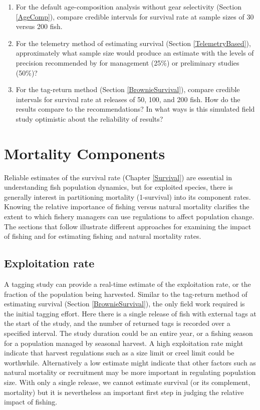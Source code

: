 \documentclass[
]{krantz}
\begin{document}
\begin{enumerate}
\def\labelenumi{\arabic{enumi}.}
\item
  For the default age-composition analysis without gear selectivity (Section \ref{AgeComp}), compare credible intervals for survival rate at sample sizes of 30 versus 200 fish.
\item
  For the telemetry method of estimating survival (Section \ref{TelemetryBased}), approximately what sample size would produce an estimate with the levels of precision recommended by \citet{robson.regier1964} for management (25\%) or preliminary studies (50\%)?
\item
  For the tag-return method (Section \ref{BrownieSurvival}), compare credible intervals for survival rate at releases of 50, 100, and 200 fish. How do the results compare to the \citet{robson.regier1964} recommendations? In what ways is this simulated field study optimistic about the reliability of results?
\end{enumerate}

\hypertarget{Mortality}{%
\chapter{Mortality Components}\label{Mortality}}

Reliable estimates of the survival rate (Chapter \ref{Survival}) are essential in understanding fish population dynamics, but for exploited species, there is generally interest in partitioning mortality (1-survival) into its component rates. Knowing the relative importance of fishing versus natural mortality clarifies the extent to which fishery managers can use regulations to affect population change. The sections that follow illustrate different approaches for examining the impact of fishing and for estimating fishing and natural mortality rates.

\hypertarget{ExpRate}{%
\section{Exploitation rate}\label{ExpRate}}

A tagging study can provide a real-time estimate of the exploitation rate, or the fraction of the population being harvested. Similar to the tag-return method of estimating survival (Section \ref{BrownieSurvival}), the only field work required is the initial tagging effort. Here there is a single release of fish with external tags at the start of the study, and the number of returned tags is recorded over a specified interval. The study duration could be an entire year, or a fishing season for a population managed by seasonal harvest. A high exploitation rate might indicate that harvest regulations such as a size limit or creel limit could be worthwhile. Alternatively a low estimate might indicate that other factors such as natural mortality or recruitment may be more important in regulating population size. With only a single release, we cannot estimate survival (or its complement, mortality) but it is nevertheless an important first step in judging the relative impact of fishing.
\end{document}
